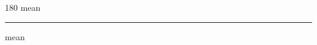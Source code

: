 
\begin{frame}
\begin{center}
\begin{turn}{180}
{\fontsize{2.5cm}{1em}\selectfont mean}
\end{turn}
\vspace{1em}\par  
\hrule
\vspace{1em}\par  
{\fontsize{2.5cm}{1em}\selectfont mean}
\end{center}
\end{frame}
